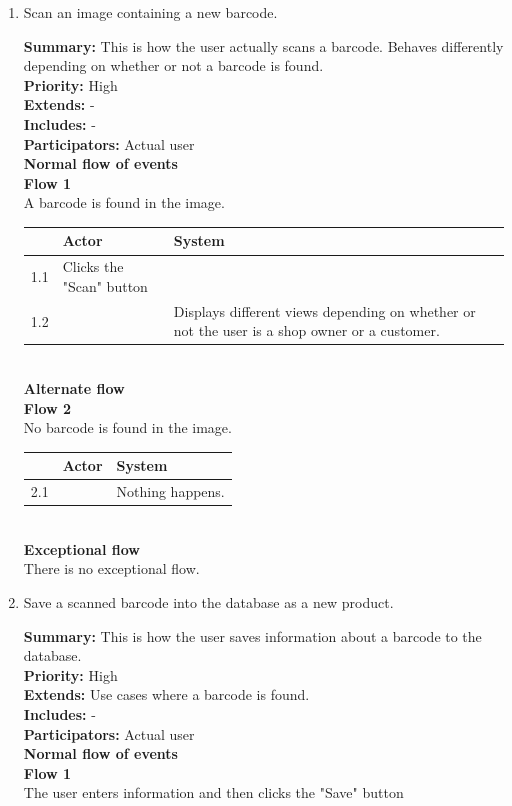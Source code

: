 \documentclass{report}
\begin{document}
\begin{enumerate}

  \item Scan an image containing a new barcode. \

    \textbf{Summary:} This is how the user actually scans a barcode. Behaves differently depending on whether or not a barcode is found. \\
    \textbf{Priority:} High \\
    \textbf{Extends:} - \\
    \textbf{Includes:} - \\
    \textbf{Participators:} Actual user \\
    \textbf{Normal flow of events} \\
    \textbf{Flow 1} \\ A barcode is found in the image. \\

    \begin{tabular}{ | l | p{4cm} | p{4cm} |}
    \hline
      & Actor & System \\ \hline
    1.1 & Clicks the "Scan" button & \\ \hline
    1.2 & & Displays different views depending on whether or not the user is a shop owner or a customer. \\
    \hline
    \end{tabular} \\

    \textbf{Alternate flow} \\
    \textbf{Flow 2} \\ No barcode is found in the image. \\

    \begin{tabular}{ | l | p{4cm} | p{4cm} |}
    \hline
      & Actor & System \\ \hline
    2.1 & & Nothing happens. \\
    \hline
    \end{tabular} \\

    \textbf{Exceptional flow} \\ There is no exceptional flow.

  \item Save a scanned barcode into the database as a new product. \

    \textbf{Summary:} This is how the user saves information about a barcode to the database. \\
    \textbf{Priority:} High \\
    \textbf{Extends:} Use cases where a barcode is found. \\
    \textbf{Includes:} - \\
    \textbf{Participators:} Actual user \\
    \textbf{Normal flow of events} \\
    \textbf{Flow 1} \\ The user enters information and then clicks the "Save" button \\


\end{enumerate}
\end{document}
